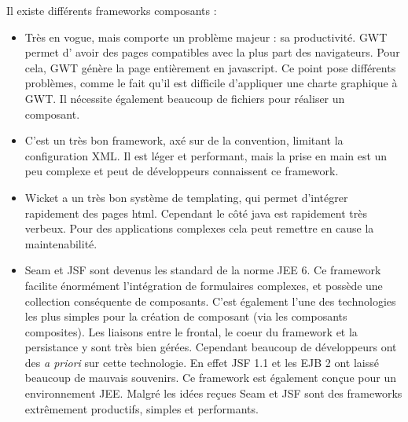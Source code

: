 Il existe différents frameworks composants :
\begin{itemize}
	\item {}
		Très en vogue, mais comporte un problème majeur : sa productivité. GWT permet d'
		avoir des pages compatibles avec la plus part des navigateurs. Pour cela, GWT génère
		la page entièrement en javascript. Ce  point pose différents problèmes, comme le fait
		qu'il est difficile d'appliquer une charte graphique à GWT. Il nécessite également beaucoup
		de fichiers pour réaliser un composant.
		\\
		
	\item {}
		C'est un très bon framework, axé sur de la convention, limitant la configuration XML.
		Il est léger et performant, mais la prise en main est un peu complexe et peut de développeurs
		connaissent ce framework.
		\\
		
	\item {}
		Wicket a un très bon système de templating, qui permet d'intégrer rapidement des pages
		html. Cependant le côté java est rapidement très verbeux. Pour des applications complexes
		cela peut remettre en cause la maintenabilité. 
		\\

	\item {}
		Seam et JSF sont devenus les standard de la norme JEE 6. Ce framework facilite énormément
		l'intégration de formulaires complexes, et possède une collection conséquente de composants. 
		C'est également l'une des technologies les plus simples pour la création de composant (via les
		composants composites). Les liaisons entre le frontal, le coeur du framework et la persistance
		y sont très bien gérées. Cependant beaucoup de développeurs ont des \textit{a priori} sur cette technologie.
		En effet JSF 1.1 et les EJB 2 ont laissé beaucoup de mauvais souvenirs. Ce framework est également
		conçue pour un environnement JEE. Malgré les idées reçues Seam et JSF sont des frameworks
		extrêmement productifs, simples et performants. 

\end{itemize}


